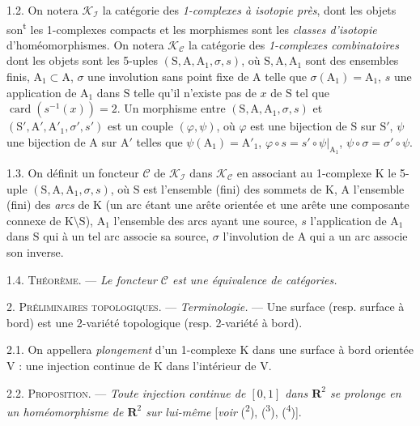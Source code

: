1.2. On notera \(\mathscr{K}_{\mathscr I}\) la catégorie des \textit{1-complexes à isotopie près}, dont les objets son\textsuperscript{t} les 1-complexes compacts et les morphismes sont les \textit{classes d'isotopie} d'homéomorphismes. On notera \(\mathscr{K}_{\mathscr C}\) la catégorie des \textit{1-complexes combinatoires} dont les objets sont les 5-uples \((\mathrm{S},\mathrm{A},\mathrm{A}_1,\sigma,s)\), où \(\mathrm{S},\mathrm{A},\mathrm{A}_1\) sont des ensembles finis, \(\mathrm{A}_1\subset\mathrm{A}\), \(\sigma\) une involution sans point fixe de \(\mathrm{A}\) telle que \(\sigma(\mathrm{A}_1)=\mathrm{A}_1\), \(s\) une application de \(\mathrm{A}_1\) dans \(\mathrm{S}\) telle qu'il n'existe pas de \(x\) de \(\mathrm{S}\) tel que \(\operatorname{card}(s^{-1}(x))=2\). Un morphisme entre \((\mathrm{S},\mathrm{A},\mathrm{A}_1,\sigma,s)\) et \((\mathrm{S}',\mathrm{A}',\mathrm{A}'_1,\sigma',s')\) est un couple \((\varphi,\psi)\), où \(\varphi\) est une bijection de \(\mathrm{S}\) sur \(\mathrm{S}'\), \(\psi\) une bijection de \(\mathrm{A}\) sur \(\mathrm{A}'\) telles que \(\psi(\mathrm{A}_1)=\mathrm{A}'_1\), \(\varphi\circ s=s'\circ\psi\vert_{\mathrm{A}_1}\), \(\psi\circ\sigma=\sigma'\circ\psi\).

1.3. On définit un foncteur \(\mathscr{C}\) de \(\mathscr{K}_{\mathscr I}\) dans \(\mathscr{K}_{\mathscr C}\) en associant au 1-complexe \(\mathrm{K}\) le 5-uple \((\mathrm{S},\mathrm{A},\mathrm{A}_1,\sigma,s)\), où \(\mathrm{S}\) est l'ensemble (fini) des sommets de \(\mathrm{K}\), \(\mathrm{A}\) l'ensemble (fini) des \textit{arcs} de \(\mathrm{K}\) (un arc étant une arête orientée et une arête une composante connexe de \(\mathrm{K}\setminus\mathrm{S}\)), \(\mathrm{A}_1\) l'ensemble des arcs ayant une source, \(s\) l'application de \(\mathrm{A}_1\) dans \(\mathrm{S}\) qui à un tel arc associe sa source, \(\sigma\) l'involution de \(\mathrm{A}\) qui a un arc associe son inverse.

1.4. \textsc{Théorème.} --- \textit{Le foncteur \(\mathscr{C}\) est une équivalence de catégories.}

2. \textsc{Préliminaires topologiques.} --- \textit{Terminologie.} --- Une surface (resp. surface à bord) est une 2-variété topologique (resp. 2-variété à bord).

2.1. On appellera \textit{plongement} d'un 1-complexe \(\mathrm{K}\) dans une surface à bord orientée \(\mathrm{V}\) : une injection continue de \(\mathrm{K}\) dans l'intérieur de \(\mathrm{V}\).

2.2. \textsc{Proposition.} --- \textit{Toute injection continue de \([0,1]\) dans \(\mathbf{R}^2\) se prolonge en un homéomorphisme de \(\mathbf{R}^2\) sur lui-même} [\textit{voir} (\textsuperscript{2}), (\textsuperscript{3}), (\textsuperscript{4})].

